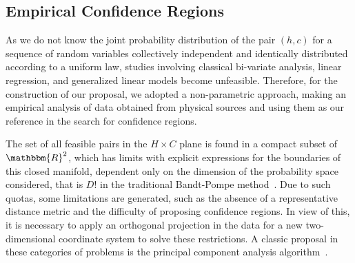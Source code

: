 \subsection{Empirical Confidence Regions}\label{confidenceRegions}

As we do not know the joint probability distribution of the pair $(h, c)$ for a sequence of random variables collectively independent and identically distributed according to a uniform law, studies involving classical bi-variate analysis, linear regression, and generalized linear models become unfeasible.
Therefore, for the construction of our proposal, we adopted a non-parametric approach, making an empirical analysis of data obtained from physical sources and using them as our reference in the search for confidence regions.

The set of all feasible pairs in the $H \times C$ plane is found in a compact subset of $\mathbbm{R}^2$, which has limits with explicit expressions for the boundaries of this closed manifold, dependent only on the dimension of the probability space considered, that is $D!$ in the traditional Bandt-Pompe method~\cite{martin2006generalized}.
Due to such quotas, some limitations are generated, such as the absence of a representative distance metric and the difficulty of proposing confidence regions.
In view of this, it is necessary to apply an orthogonal projection in the data for a new two-dimensional coordinate system to solve these restrictions.
A classic proposal in these categories of problems is the principal component analysis algorithm~\cite{wold1987principal}.

